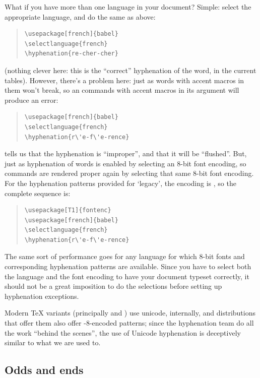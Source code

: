 What if you have more than one language in your document?  Simple:
select the appropriate language, and do the same as above:
\begin{quote}
\begin{verbatim}
\usepackage[french]{babel}
\selectlanguage{french}
\hyphenation{re-cher-cher}
\end{verbatim}
\end{quote}
(nothing clever here: this is the ``correct'' hyphenation of the word,
in the current tables).  However, there's a problem here: just as
words with accent macros in them won't break, so an 
commands with accent macros in its argument will produce an error:
\begin{quote}
\begin{verbatim}
\usepackage[french]{babel}
\selectlanguage{french}
\hyphenation{r\'e-f\'e-rence}
\end{verbatim}
\end{quote}
tells us that the hyphenation is ``improper'', and that it will be ``flushed''.
But, just as hyphenation of words is enabled by selecting an 8-bit
font encoding, so  commands are rendered proper again
by selecting that same 8-bit font encoding.  For the hyphenation
patterns provided for `legacy', the encoding is
, so the complete sequence is:
\begin{quote}
\begin{verbatim}
\usepackage[T1]{fontenc}
\usepackage[french]{babel}
\selectlanguage{french}
\hyphenation{r\'e-f\'e-rence}
\end{verbatim}
\end{quote}
The same sort of performance goes for any language for which 8-bit
fonts and corresponding hyphenation patterns are available.  Since you
have to select both the language and the font encoding to have your
document typeset correctly, it should not be a great imposition to do
the selections before setting up hyphenation exceptions.

Modern TeX variants (principally \xetex{} and \luatex{}) use unicode,
internally, and distributions that offer them also offer
-8-encoded patterns; since the hyphenation team do all the
work ``behind the scenes'', the use of Unicode hyphenation is
deceptively similar to what we are used to.

\subsection{Odds and ends}

